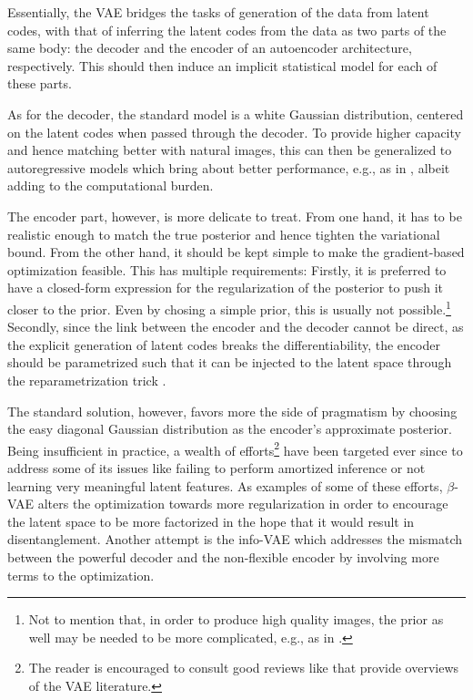 \documentclass{article}
\begin{document}
Essentially, the VAE bridges the tasks of generation of the data from latent codes, with that of inferring the latent codes from the data as two parts of the same body: the decoder and the encoder of an autoencoder architecture, respectively. This should then induce an implicit statistical model for each of these parts.

As for the decoder, the standard model is a white Gaussian distribution, centered on the latent codes when passed through the decoder. To provide higher capacity and hence matching better with natural images, this can then be generalized to autoregressive models which bring about better performance, e.g., as in \cite{FlowVAE, gulrajani2016pixelvae, lucas2018auxiliary}, albeit adding to the computational burden. 


The encoder part, however, is more delicate to treat. From one hand, it has to be realistic enough to match the true posterior and hence tighten the variational bound. From the other hand, it should be kept simple to make the gradient-based optimization feasible. This has multiple requirements: Firstly, it is preferred to have a closed-form expression for the regularization of the posterior to push it closer to the prior. Even by chosing a simple prior, this is usually not possible.\footnote{Not to mention that, in order to produce high quality images, the prior as well may be needed to be more complicated, e.g., as in \cite{VampPrior}.} Secondly, since the link between the encoder and the decoder cannot be direct, as the explicit generation of latent codes breaks the differentiability, the encoder should be parametrized such that it can be injected to the latent space through the reparametrization trick \cite{VAE}. 

The standard solution, however, favors more the side of pragmatism by choosing the easy diagonal Gaussian distribution as the encoder's approximate posterior. Being insufficient in practice, a wealth of efforts\footnote{The reader is encouraged to consult good reviews like \cite{tschannen2018recent} that provide overviews of the VAE literature.} have been targeted ever since to address some of its issues like failing to perform amortized inference or not learning very meaningful latent features. As examples of some of these efforts, $\beta$-VAE \cite{higgins2017beta} alters the optimization towards more regularization in order to encourage the latent space to be more factorized in the hope that it would result in disentanglement. Another attempt is the info-VAE \cite{InfoVAE} which addresses the mismatch between the powerful decoder and the non-flexible encoder by involving more terms to the optimization.
\end{document}

